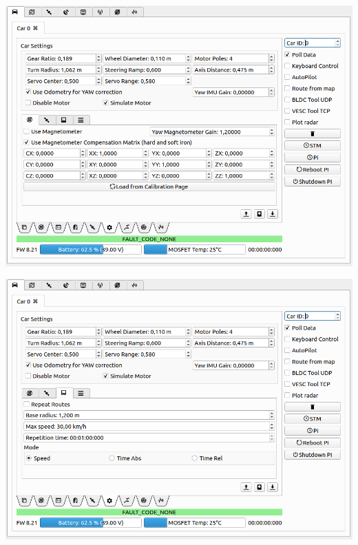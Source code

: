 \documentclass[12pt]{article} %
\begin{document}
\noindent\begin{minipage}{0.5\linewidth}
\noindent \includegraphics[width=\textwidth]{./screens/car_tab_simulate.png}
\end{minipage}
\begin{minipage}{0.5\linewidth}
\noindent \includegraphics[width=\textwidth]{./screens/car_tab_autopilot.png}
\end{minipage}
\end{document}
